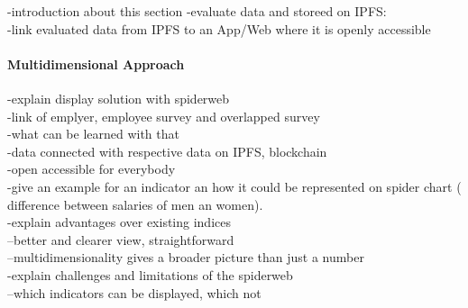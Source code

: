 -introduction about this section
-evaluate data and storeed on IPFS:\\
-link evaluated data from IPFS to an App/Web where it is openly accessible
\paragraph*{Multidimensional Approach}


-explain display solution with spiderweb\\
-link of emplyer, employee survey and overlapped survey\\
-what can be learned with that\\
-data connected with respective data on IPFS, blockchain\\
-open accessible for everybody\\
-give an example for an indicator an how it could be represented on spider chart ( difference between salaries of men an women).\\
-explain advantages over existing indices\\
--better and clearer view, straightforward\\
--multidimensionality gives a broader picture than just a number\\
-explain challenges and limitations of the spiderweb\\
--which indicators can be displayed, which not\\
		